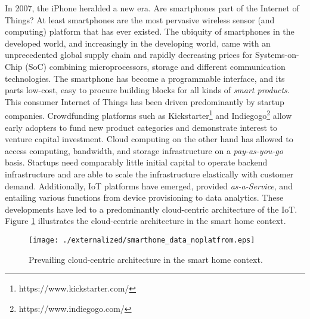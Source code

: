 In 2007, the iPhone heralded a new era. Are smartphones part of the Internet of Things? At least smartphones are the most pervasive wireless sensor (and computing) platform that has ever existed. The ubiquity of smartphones in the developed world, and increasingly in the developing world, came with an unprecedented global supply chain and rapidly decreasing prices for Systems-on-Chip (SoC) combining microprocessors, storage and different communication technologies. The smartphone has become a programmable interface, and its parts low-cost, easy to procure building blocks for all kinds of \emph{smart products}. This consumer Internet of Things has been driven predominantly by startup companies. Crowdfunding platforms such as Kickstarter\footnote{https://www.kickstarter.com/} and Indiegogo\footnote{https://www.indiegogo.com/} allow early adopters to fund new product categories and demonstrate interest to venture capital investment. Cloud computing on the other hand has allowed to access computing, bandwidth, and storage infrastructure on a \emph{pay-as-you-go} basis. Startups need comparably little initial capital to operate backend infrastructure and are able to scale the infrastructure elastically with customer demand. Additionally, IoT platforms have emerged, provided \emph{as-a-Service}, and entailing various functions from device provisioning to data analytics. These developments have led to a predominantly cloud-centric architecture of the IoT. Figure \ref{fig:smarthome} illustrates the cloud-centric architecture in the smart home context.


\begin{figure}
\centering
\texttt{[image: ./externalized/smarthome\_data\_noplatfrom.eps]}
\caption{Prevailing cloud-centric architecture in the smart home context.}
\label{fig:smarthome}
\end{figure}





